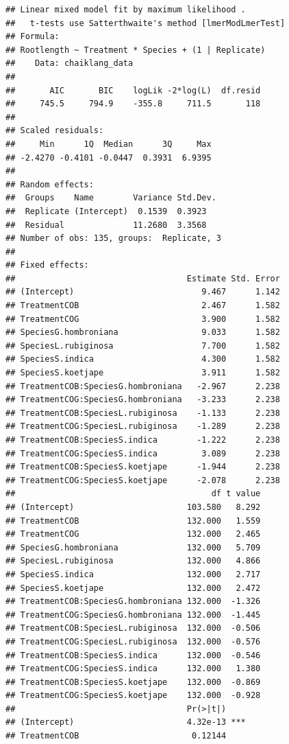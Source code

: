 \documentclass[
]{book}
\begin{document}
\begin{verbatim}
## Linear mixed model fit by maximum likelihood .
##   t-tests use Satterthwaite's method [lmerModLmerTest]
## Formula: 
## Rootlength ~ Treatment * Species + (1 | Replicate)
##    Data: chaiklang_data
## 
##       AIC       BIC    logLik -2*log(L)  df.resid 
##     745.5     794.9    -355.8     711.5       118 
## 
## Scaled residuals: 
##     Min      1Q  Median      3Q     Max 
## -2.4270 -0.4101 -0.0447  0.3931  6.9395 
## 
## Random effects:
##  Groups    Name        Variance Std.Dev.
##  Replicate (Intercept)  0.1539  0.3923  
##  Residual              11.2680  3.3568  
## Number of obs: 135, groups:  Replicate, 3
## 
## Fixed effects:
##                                   Estimate Std. Error
## (Intercept)                          9.467      1.142
## TreatmentCOB                         2.467      1.582
## TreatmentCOG                         3.900      1.582
## SpeciesG.hombroniana                 9.033      1.582
## SpeciesL.rubiginosa                  7.700      1.582
## SpeciesS.indica                      4.300      1.582
## SpeciesS.koetjape                    3.911      1.582
## TreatmentCOB:SpeciesG.hombroniana   -2.967      2.238
## TreatmentCOG:SpeciesG.hombroniana   -3.233      2.238
## TreatmentCOB:SpeciesL.rubiginosa    -1.133      2.238
## TreatmentCOG:SpeciesL.rubiginosa    -1.289      2.238
## TreatmentCOB:SpeciesS.indica        -1.222      2.238
## TreatmentCOG:SpeciesS.indica         3.089      2.238
## TreatmentCOB:SpeciesS.koetjape      -1.944      2.238
## TreatmentCOG:SpeciesS.koetjape      -2.078      2.238
##                                        df t value
## (Intercept)                       103.580   8.292
## TreatmentCOB                      132.000   1.559
## TreatmentCOG                      132.000   2.465
## SpeciesG.hombroniana              132.000   5.709
## SpeciesL.rubiginosa               132.000   4.866
## SpeciesS.indica                   132.000   2.717
## SpeciesS.koetjape                 132.000   2.472
## TreatmentCOB:SpeciesG.hombroniana 132.000  -1.326
## TreatmentCOG:SpeciesG.hombroniana 132.000  -1.445
## TreatmentCOB:SpeciesL.rubiginosa  132.000  -0.506
## TreatmentCOG:SpeciesL.rubiginosa  132.000  -0.576
## TreatmentCOB:SpeciesS.indica      132.000  -0.546
## TreatmentCOG:SpeciesS.indica      132.000   1.380
## TreatmentCOB:SpeciesS.koetjape    132.000  -0.869
## TreatmentCOG:SpeciesS.koetjape    132.000  -0.928
##                                   Pr(>|t|)    
## (Intercept)                       4.32e-13 ***
## TreatmentCOB                       0.12144    

\end{verbatim}
\end{document}

